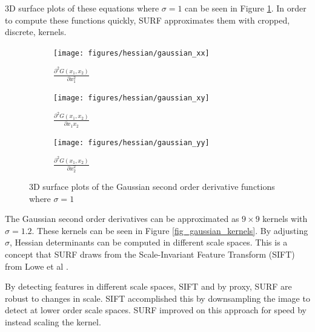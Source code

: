 \documentclass{article}
\begin{document}
3D surface plots of these equations where $\sigma=1$ can be seen in Figure \ref{fig_gaussian_surface_plots}. In order to compute these functions quickly, SURF approximates them with cropped, discrete, kernels. 

\begin{figure}[h]
	\centering
	\begin{subfigure}[b]{0.45\textwidth}
		\centering
		\texttt{[image: figures/hessian/gaussian\_xx]}
		\caption{$\frac{\partial^2 G(x_1, x_2)}{\partial x_1^2}$}
	\end{subfigure}
	\begin{subfigure}[b]{0.45\textwidth}
		\centering
		\texttt{[image: figures/hessian/gaussian\_xy]}
		\caption{$\frac{\partial^2 G(x_1, x_2)}{\partial x_1 x_2}$}
	\end{subfigure}
	\begin{subfigure}[b]{0.45\textwidth}
		\centering
		\texttt{[image: figures/hessian/gaussian\_yy]}
		\caption{$\frac{\partial^2 G(x_1, x_2)}{\partial x_2^2}$}
	\end{subfigure}
	\caption{3D surface plots of the Gaussian second order derivative functions where $\sigma=1$}
	\label{fig_gaussian_surface_plots}
\end{figure}

The Gaussian second order derivatives can be approximated as $9 \times 9$ kernels with $\sigma=1.2$. These kernels can be seen in Figure \ref{fig_gaussian_kernels}. By adjusting $\sigma$, Hessian determinants can be computed in different scale spaces. This is a concept that SURF draws from the Scale-Invariant Feature Transform (SIFT) from Lowe et al \cite{lowe_distinctive_2004}.

 By detecting features in different scale spaces, SIFT and by proxy, SURF are robust to changes in scale. SIFT accomplished this by downsampling the image to detect at lower order scale spaces. SURF improved on this approach for speed by instead scaling the kernel.
\end{document}

